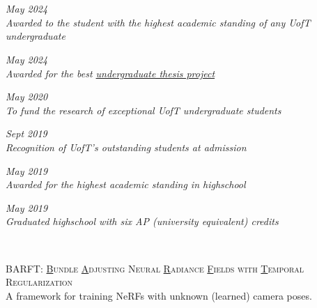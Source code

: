 \documentclass{article}
\newcommand{\tikzrule}[3][]{\tikz{\fill[#1] (0,0) rectangle (#2,#3);}\vspace{0.5em}}
\begin{document}
{{{{{{{{{\vspace{0.5em}
\\
\tikzrule[black, path fading=east]{\textwidth}{1pt}

 \\
\faCalendar{} \textit{May 2024} \\
\indent{}\textit{Awarded to the student with the highest academic standing of any UofT undergraduate}
\vspace{1em}

 \hfill \faCalendar{} \textit{May 2024} \\
\indent{}\textit{Awarded for the best \href{https://benagro314.github.io/files/bagro_engsci_thesis.pdf}{undergraduate thesis project}}
\vspace{1em}

 \hfill \faCalendar{} \textit{May 2020} \\
\indent{}\textit{To fund the research of exceptional UofT undergraduate students}
\vspace{1em}

 \hfill \faCalendar{} \textit{Sept 2019} \\
\indent{}\textit{Recognition of UofT’s outstanding students at admission}
\vspace{1em}

 \hfill \faCalendar{} \textit{May 2019} \\
\indent{}\textit{Awarded for the highest academic standing in highschool}
\vspace{1em}


 \hfill \faCalendar{} \textit{May 2019} \\
\indent{}\textit{Graduated highschool with six AP (university equivalent) credits}
\vspace{1em}


\vspace{0.5em}
\\
\tikzrule[black, path fading=east]{\textwidth}{1pt}


\noindent{}\textsc{BARFT: \underline{B}undle \underline{A}djusting Neural \underline{R}adiance \underline{F}ields with \underline{T}emporal Regularization} \hfill 
\href{https://benagro314.github.io/files/CSC2532_Final_Project_Report.pdf}{\faFilePdf{}} \textbullet{} 
\href{https://github.com/souravb111/bundle-adjusting-NeRF/tree/bagro/sched}{\faGithub{}}  \\
\indent{}A framework for training NeRFs with unknown (learned) camera poses.
\vspace{1em}

}}}}}}}}}
\end{document}
